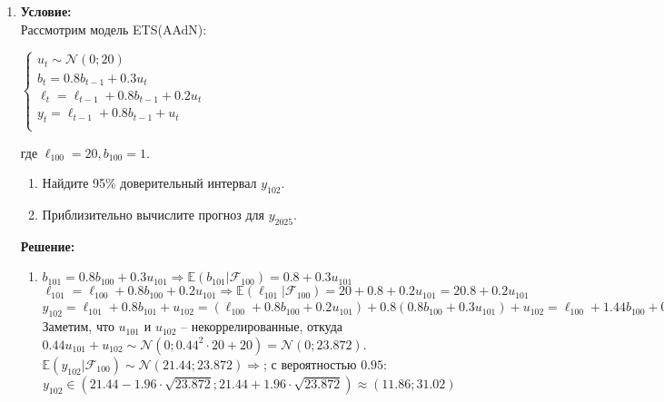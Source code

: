 \documentclass{article}
\begin{document}
\begin{enumerate}
\item \textbf{Условие:} \\
Рассмотрим модель ETS(AAdN):\\
\begin{center}
    \begin{math}
        \begin{cases}
            u_t \sim \mathcal{N}(0; 20) \\
            b_t = 0.8b_{t-1} + 0.3u_t \\
            \ell_t = \ell_{t-1} + 0.8b_{t-1} + 0.2u_t \\
            y_t = \ell_{t-1} + 0.8b_{t-1} + u_t \\
        \end{cases}
    \end{math}
\end{center}

где $\ell_{100} = 20, b_{100} = 1$.
\begin{enumerate}
    \item Найдите 95\% доверительный интервал $y_{102}$.
    \item Приблизительно вычислите прогноз для $y_{2025}$.
\end{enumerate}

\textbf{Решение:}
\begin{enumerate}
    \item $b_{101} = 0.8b_{100} + 0.3u_{101} \Rightarrow \mathbb{E}(b_{101}|\mathcal{F}_{100}) = 0.8 + 0.3u_{101}$ \\
    $\ell_{101} = \ell_{100} + 0.8b_{100} + 0.2u_{101} \Rightarrow  \mathbb{E}(\ell_{101}|\mathcal{F}_{100}) = 20 + 0.8 + 0.2u_{101} = 20.8 + 0.2u_{101}$ \\
    $y_{102} = \ell_{101} + 0.8b_{101} + u_{102} = (\ell_{100} + 0.8b_{100} + 0.2u_{101}) + 0.8(0.8b_{100} + 0.3u_{101}) + u_{102} =
    \ell_{100} + 1.44b_{100} + 0.44u_{101} + u_{102} \Rightarrow \mathbb{E}(y_{102}|\mathcal{F}_{100}) = 20 + 1.44 \cdot 1 + 0.44u_{101} + u_{102} =
    21.44 + 0.44u_{101} + u_{102}$
    Заметим, что $u_{101}$ и $u_{102}$ -- некоррелированные, откуда $0.44u_{101} + u_{102}\sim\mathcal{N}(0; 0.44^2 \cdot 20 + 20) = \mathcal{N}(0; 23.872)$. \\
    $\mathbb{E}(y_{102}|\mathcal{F}_100) \sim \mathcal{N}(21.44; 23.872)\Rightarrow$; с вероятностью $0.95:$
    $$y_{102}\in(21.44 - 1.96\cdot\sqrt{23.872}; 21.44 + 1.96\cdot\sqrt{23.872})\approx(11.86; 31.02)$$


\end{enumerate}
\end{enumerate}
\end{document}
